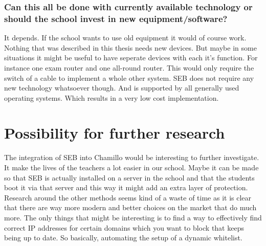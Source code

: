 \subsubsection{Can this all be done with currently available technology or should the school invest in new equipment/software?}
It depends. If the school wants to use old equipment it would of course work. Nothing that was described in this thesis needs new devices. But maybe in some situations it might be useful to have seperate devices with each it's function. For instance one exam router and one all-round router. This would only require the switch of a cable to implement a whole other system. SEB does not require any new technology whatsoever though. And is supported by all generally used operating systems. Which results in a very low cost implementation.
\section{Possibility for further research}
The integration of SEB into Chamillo would be interesting to further investigate. It make the lives of the teachers a lot easier in our school. Maybe it can be made so that SEB is actually installed on a server in the school and that the students boot it via that server and this way it might add an extra layer of protection. Research around the other methods seems kind of a waste of time as it is clear that there are way more modern and better choices on the market that do much more. The only things that might be interesting is to find a way to effectively find correct IP addresses for certain domains which you want to block that keeps being up to date. So basically, automating the setup of a dynamic whitelist. 
